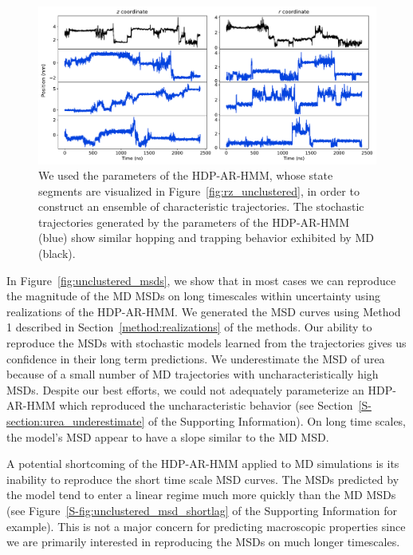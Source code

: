 \documentclass[journal=jpcbfk,manuscript=article]{achemso}
\begin{document}
  \begin{figure}
  \centering
  \includegraphics[width=\textwidth]{qualitative_unclustered_MET2.pdf}
  \caption{We used the parameters of the HDP-AR-HMM, whose state segments are 
  visualized in Figure~\ref{fig:rz_unclustered}, in order to construct an 
  ensemble of characteristic trajectories. The stochastic trajectories 
  generated by the parameters of the HDP-AR-HMM (blue) show similar hopping
  and trapping behavior exhibited by MD (black).
  }\label{fig:qualitative_unclustered}
  \end{figure}
  
  In Figure~\ref{fig:unclustered_msds}, we show that in most cases we can 
  reproduce the magnitude of the MD MSDs on long timescales within uncertainty
  using realizations of the HDP-AR-HMM. We generated the MSD curves using Method
  1 described in Section~\ref{method:realizations} of the methods. Our ability
  to reproduce the MSDs with stochastic models learned from the trajectories gives us confidence in their long term predictions.
  We underestimate the MSD of urea because of a small number of MD trajectories
  with uncharacteristically high MSDs. Despite our best efforts, we could not 
  adequately parameterize an HDP-AR-HMM which reproduced the uncharacteristic
  behavior (see Section~\ref{S-section:urea_underestimate} of the Supporting Information).
  On long time scales, the model's MSD appear to have a slope similar to the MD 
  MSD.

  A potential shortcoming of the HDP-AR-HMM applied to MD simulations is its 
  inability to reproduce the short time scale MSD curves. The MSDs predicted
  by the model tend to enter a linear regime much more quickly than the MD MSDs
  (see Figure~\ref{S-fig:unclustered_msd_shortlag} of the Supporting Information
  for example). This is not a major concern for predicting macroscopic properties
  since we are primarily interested in reproducing the MSDs on much longer 
  timescales.
  
\end{document}
